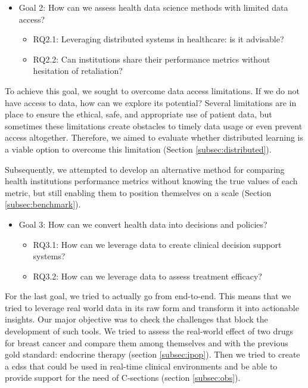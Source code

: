 \begin{itemize}

    \item Goal 2: How can we assess health data science methods with limited data access?
    \begin{itemize}
        \item RQ2.1: Leveraging distributed systems in healthcare: is it advisable?
        \item RQ2.2: Can institutions share their performance metrics without hesitation of retaliation?
    \end{itemize}
\end{itemize}

To achieve this goal, we sought to overcome data access limitations. If we do not have access to data, how can we explore its potential? Several limitations are in place to ensure the ethical, safe, and appropriate use of patient data, but sometimes these limitations create obstacles to timely data usage or even prevent access altogether. Therefore, we aimed to evaluate whether distributed learning is a viable option to overcome this limitation (Section \ref{subsec:distributed}).

Subsequently, we attempted to develop an alternative method for comparing health institutions performance metrics without knowing the true values of each metric, but still enabling them to position themselves on a scale (Section \ref{subsec:benchmark}).

\begin{itemize}
    \item Goal 3: How can we convert health data into decisions and policies?
    \begin{itemize}
        \item RQ3.1: How can we leverage data to create clinical decision support systems?
        \item RQ3.2: How can we leverage data to assess treatment efficacy?
    \end{itemize}    
\end{itemize}

For the last goal, we tried to actually go from end-to-end. This means that we tried to leverage real world data in its raw form and transform it into actionable insights. Our major objective was to check the challenges that block the development of such tools. We tried to assess the real-world effect of two drugs for breast cancer and compare them among themselves and with the previous gold standard: endocrine therapy (section \ref{subsec:ipop}). Then we tried to create a \ac{cdss} that could be used in real-time clinical environments and be able to provide support for the need of C-sections (section \ref{subsec:obs}). 